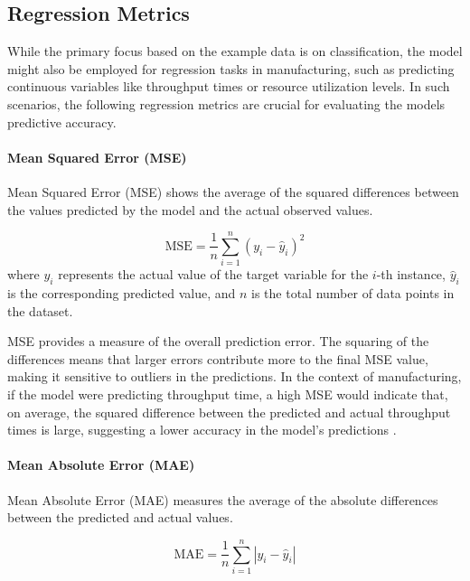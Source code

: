 \begin{appendices}
  \subsection{Regression Metrics}

  While the primary focus based on the example data is on classification, the model might also be employed for regression tasks in manufacturing, such as predicting continuous variables like throughput times or resource utilization levels. In such scenarios, the following regression metrics are crucial for evaluating the models predictive accuracy.

  \paragraph{\textbf{Mean Squared Error (MSE)}}
  Mean Squared Error (MSE) shows the average of the squared differences between the values predicted by the model and the actual observed values.

  \begin{equation}
    \text{MSE} = \frac{1}{n} \sum_{i=1}^{n} (y_i - \hat{y}_i)^2
  \end{equation}
  where $y_i$ represents the actual value of the target variable for the $i$-th instance, $\hat{y}_i$ is the corresponding predicted value, and $n$ is the total number of data points in the dataset.

  MSE provides a measure of the overall prediction error. The squaring of the differences means that larger errors contribute more to the final MSE value, making it sensitive to outliers in the predictions. In the context of manufacturing, if the model were predicting throughput time, a high MSE would indicate that, on average, the squared difference between the predicted and actual throughput times is large, suggesting a lower accuracy in the model's predictions \autocite{fahrmeir2016statistik}.

  \paragraph{\textbf{Mean Absolute Error (MAE)}}
  Mean Absolute Error (MAE) measures the average of the absolute differences between the predicted and actual values.

  \begin{equation}
    \text{MAE} = \frac{1}{n} \sum_{i=1}^{n} |y_i - \hat{y}_i|
  \end{equation}


\end{appendices}
